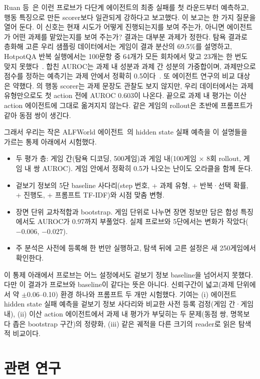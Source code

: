 \documentclass[10pt]{article}
\begin{document}
Ruan 등~\cite{ruan2026doomed}은 이런 프로브가 다단계 에이전트의 최종 실패를 첫 라운드부터 예측하고, 행동 특징으로 만든 scorer보다 일관되게 강하다고 보고했다.
이 보고는 한 가지 질문을 열어 둔다. 이 신호는 현재 시도가 어떻게 진행되는지를 보여 주는가, 아니면 에이전트가 어떤 과제를 맡았는지를 보여 주는가?
결과는 대부분 과제가 정한다. 탐욕 결과로 층화해 고른 우리 샘플링 데이터에서는 게임이 결과 분산의 69.5\%를 설명하고, HotpotQA 반복 실행에서는 100문항 중 64개가 모든 회차에서 맞고 23개는 한 번도 맞지 못했다~\cite{mehta2026commit}.
합친 AUROC는 과제 내 성분과 과제 간 성분의 가중합이며, 과제만으로 점수를 정하는 예측기는 과제 안에서 정확히 0.5이다~\cite{bulut2026problem}.
또 에이전트 연구의 비교 대상은 약했다. \cite{ruan2026doomed}의 행동 scorer는 과제 문장도 관찰도 보지 않지만, 우리 데이터에서는 과제 유형만으로도 첫 action 전에 AUROC 0.603이 나온다.
끝으로 과제 내 평가는 이산 action 에이전트에 그대로 옮겨지지 않는다. 같은 게임의 rollout은 초반에 프롬프트가 같아 동점 쌍이 생긴다.

그래서 우리는 작은 ALFWorld 에이전트~\cite{shridhar2021alfworld}의 hidden state 실패 예측을 이 설명들을 가르는 통제 아래에서 시험했다.
\begin{itemize}
\item 두 평가 층: 게임 간(탐욕 디코딩, 500게임)과 게임 내(100게임 $\times$ 8회 rollout, 게임 내 쌍 AUROC). 게임 안에서 정확히 0.5가 나오는 난이도 오라클을 함께 둔다.
\item 겉보기 정보의 5단 baseline 사다리(step 번호, + 과제 유형, + 반복·선택 확률, + 진행도, + 프롬프트 TF-IDF)와 시점 맞춤 변형.
\item 장면 단위 교차적합과 bootstrap. 게임 단위로 나누면 장면 정보만 담은 합성 특징에서도 AUROC가 0.97까지 부풀었다. 실제 프로브와 5단에서는 변화가 작았다($-0.006$, $-0.027$).
\item 주 분석은 사전에 등록해 한 번만 실행하고, 탐색 뒤에 고른 설정은 새 250게임에서 확인한다.
\end{itemize}
이 통제 아래에서 프로브는 어느 설정에서도 겉보기 정보 baseline을 넘어서지 못했다. 다만 이 결과가 프로브와 baseline이 같다는 뜻은 아니다. 신뢰구간이 넓고(과제 단위에서 약 $\pm$0.06--0.10) 환경 하나와 프롬프트 두 개만 시험했다.
기여는 (i) 에이전트 hidden state 실패 예측을 겉보기 정보 사다리와 비교한 사전 등록 검정(게임 간·게임 내), (ii) 이산 action 에이전트에서 과제 내 평가가 부딪히는 두 문제(동점 쌍, 명목보다 좁은 bootstrap 구간)의 정량화, (iii) 같은 궤적을 다른 크기의 reader로 읽은 탐색적 비교이다.

\section{관련 연구}
\end{document}
